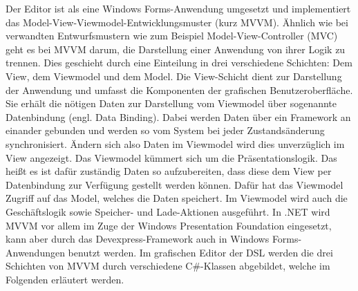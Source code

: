 Der Editor ist als eine Windows Forms-Anwendung umgesetzt und implementiert das Model-View-Viewmodel-Entwicklungsmuster (kurz MVVM). Ähnlich wie bei verwandten Entwurfsmustern wie zum Beispiel Model-View-Controller (MVC) geht es bei MVVM darum, die Darstellung einer Anwendung von ihrer Logik zu trennen. Dies geschieht durch eine Einteilung in drei verschiedene Schichten: Dem View, dem Viewmodel und dem Model. Die View-Schicht dient zur Darstellung der Anwendung und umfasst die Komponenten der grafischen Benutzeroberfläche. Sie erhält die nötigen Daten zur Darstellung vom Viewmodel über sogenannte Datenbindung (engl. Data Binding). Dabei werden Daten über ein Framework an einander gebunden und werden so vom System bei jeder Zustandsänderung synchronisiert. Ändern sich also Daten im Viewmodel wird dies unverzüglich im View angezeigt. Das Viewmodel kümmert sich um die Präsentationslogik. Das heißt es ist dafür zuständig Daten so aufzubereiten, dass diese dem View per Datenbindung zur Verfügung gestellt werden können. Dafür hat das Viewmodel Zugriff auf das Model, welches die Daten speichert. Im Viewmodel wird auch die Geschäftslogik sowie Speicher- und Lade-Aktionen ausgeführt. In .NET wird MVVM vor allem im Zuge der Windows Presentation Foundation eingesetzt, kann aber durch das Devexpress-Framework auch in Windows Forms-Anwendungen benutzt werden. 
\newline
Im grafischen Editor der DSL werden die drei Schichten von MVVM durch verschiedene C\#-Klassen abgebildet, welche im Folgenden erläutert werden.

